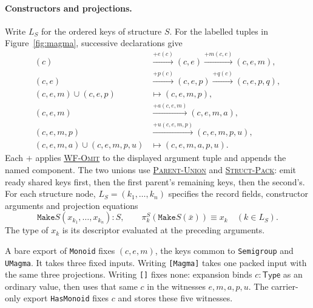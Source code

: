 \documentclass{article}
\newcommand{\ttt}[1]{\texttt{#1}}
\newcommand{\ruse}[1]{\hyperlink{rule-#1}{\textsc{#1}}}
\begin{document}
\paragraph{Constructors and projections.}
Write $L_S$ for the ordered keys of structure $S$. For the labelled tuples in
Figure~\ref{fig:magma}, successive declarations give
\[
\begin{aligned}
 (c)&\xrightarrow{+e(c)} (c,e)
     \xrightarrow{+m(c,e)} (c,e,m),\\
 (c,e)&\xrightarrow{+p(c)}(c,e,p)
     \xrightarrow{+q(c)}(c,e,p,q),\\
 (c,e,m)\cup(c,e,p)&\longmapsto(c,e,m,p),\\
 (c,e,m)&\xrightarrow{+a(c,e,m)}(c,e,m,a),\\
 (c,e,m,p)&\xrightarrow{+u(c,e,m,p)}(c,e,m,p,u),\\
 (c,e,m,a)\cup(c,e,m,p,u)&\longmapsto(c,e,m,a,p,u).
\end{aligned}
\]
Each $+$ applies \ruse{WF-Omit} to the displayed argument tuple and
appends the named component. The two unions use
\ruse{Parent-Union} and \ruse{Struct-Pack}: emit ready shared keys first,
then the first parent's remaining keys, then the second's.
For each structure node, $L_S=(k_1,\ldots,k_n)$ specifies the record fields,
constructor arguments and projection equations
\[
  \ttt{Make}S(x_{k_1},\ldots,x_{k_n}):S,\qquad
  \pi^S_k(\ttt{Make}S(\bar x))\equiv x_k \quad(k\in L_S).
\]
The type of $x_k$ is its descriptor evaluated at the preceding arguments.

A bare export of \ttt{Monoid} fixes $(c,e,m)$, the keys common to
\ttt{Semigroup} and \ttt{UMagma}. It takes three fixed inputs.
Writing \ttt{[Magma]} takes one packed input with the same three
projections. Writing \ttt{[]} fixes none: expansion binds
$c:\mathsf{Type}$ as an ordinary value, then uses that same $c$
in the witnesses $e,m,a,p,u$. The carrier-only export \ttt{HasMonoid}
fixes $c$ and stores these five witnesses.
\end{document}
